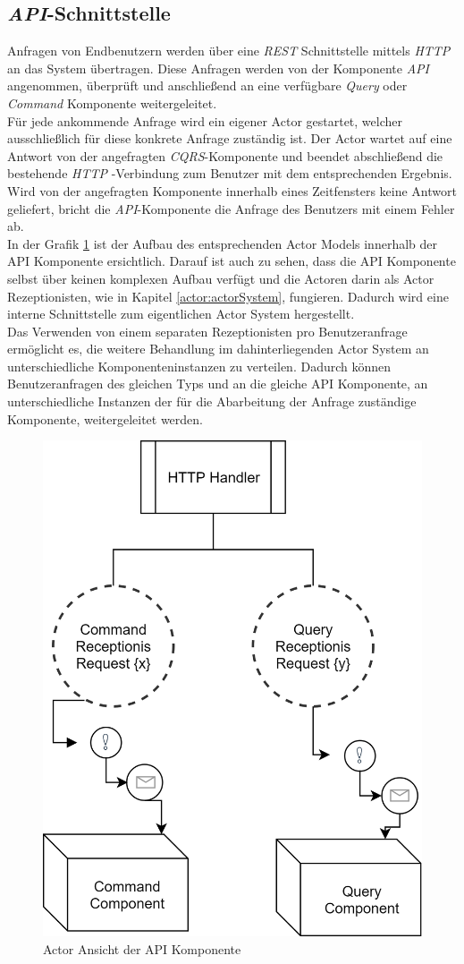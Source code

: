 \subsection{\textit{API}-Schnittstelle}
\label{subsec:implementation:apiComponente}
Anfragen von Endbenutzern werden über eine \textit{REST} Schnittstelle mittels \textit{HTTP} an das System übertragen. Diese Anfragen werden von der Komponente \textit{API} angenommen, überprüft und anschließend an eine verfügbare \textit{Query} oder \textit{Command} Komponente weitergeleitet. \\
Für jede ankommende Anfrage wird ein eigener Actor gestartet, welcher ausschließlich für diese konkrete Anfrage zuständig ist. Der Actor wartet auf eine Antwort von der angefragten \textit{CQRS}-Komponente und beendet abschließend die bestehende \textit{HTTP} -Verbindung zum Benutzer mit dem entsprechenden Ergebnis. Wird von der angefragten Komponente innerhalb eines Zeitfensters keine Antwort geliefert, bricht die \textit{API}-Komponente die Anfrage des Benutzers mit einem Fehler ab. \\
In der Grafik \ref{fig:implementation:apiActorModel} ist der Aufbau des entsprechenden Actor Models innerhalb der API Komponente ersichtlich. Darauf ist auch zu sehen, dass die API Komponente selbst über keinen komplexen Aufbau verfügt und die Actoren darin als Actor Rezeptionisten, wie in Kapitel \ref{actor:actorSystem}, fungieren. Dadurch wird eine interne Schnittstelle zum eigentlichen Actor System hergestellt. \\
Das Verwenden von einem separaten Rezeptionisten pro Benutzeranfrage ermöglicht es, die weitere Behandlung im dahinterliegenden Actor System an unterschiedliche Komponenteninstanzen zu verteilen. Dadurch können Benutzeranfragen des gleichen Typs und an die gleiche API Komponente, an unterschiedliche Instanzen der für die Abarbeitung der Anfrage zuständige Komponente, weitergeleitet werden. 
\begin{figure}
    \centering
    \includegraphics[width=0.5\linewidth]{gfx/implementation/apiActorModel}
    \caption{Actor Ansicht der API Komponente}
    \label{fig:implementation:apiActorModel}
\end{figure} 

